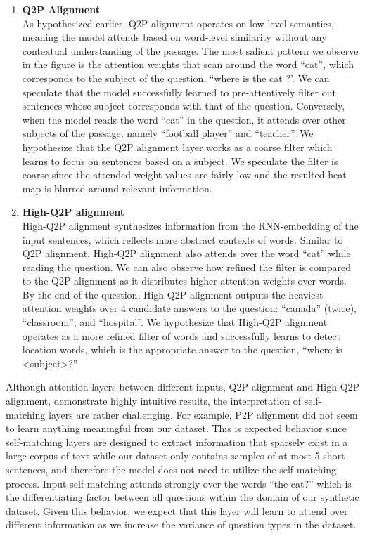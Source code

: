 \documentclass{article}
\begin{document}
\begin{enumerate}[label=(\alph*)]
	\item \textbf{Q2P Alignment} \\
	As hypothesized earlier, Q2P alignment operates on low-level semantics, meaning the model attends based on word-level similarity without any contextual understanding of the passage. The most salient pattern we observe in the figure is the attention weights that scan around the word ``cat'', which corresponds to the subject of the question, ``where is the cat ?'. We can speculate that the model successfully learned to pre-attentively filter out sentences whose subject corresponds with that of the question. Conversely, when the model reads the word ``cat'' in the question, it attends over other subjects of the passage, namely ``football player'' and ``teacher''. We hypothesize that the Q2P alignment layer works as a coarse filter which learns to focus on sentences based on a subject. We speculate the filter is coarse since the attended weight values are fairly low and the resulted heat map is blurred around relevant information. 
	
	\item \textbf{High-Q2P alignment} \\
	High-Q2P alignment synthesizes information from the RNN-embedding of the input sentences, which reflects more abstract contexts of words. Similar to Q2P alignment, High-Q2P alignment also attends over the word ``cat'' while reading the question. We can also observe how refined the filter is compared to the Q2P alignment as it distributes higher attention weights over words. By the end of the question, High-Q2P alignment outputs the heaviest attention weights over 4 candidate answers to the question: ``canada'' (twice), ``classroom'', and ``hospital''. We hypothesize that High-Q2P alignment operates as a more refined filter of words and successfully learns to detect location words, which is the appropriate answer to the question, ``where is \textless subject\textgreater ?''
\end{enumerate}

Although attention layers between different inputs, Q2P alignment and High-Q2P alignment, demonstrate highly intuitive results, the interpretation of self-matching layers are rather challenging. For example, P2P alignment did not seem to learn anything meaningful from our dataset. This is expected behavior since self-matching layers are designed to extract information that sparsely exist in a large corpus of text while our dataset only contains samples of at most 5 short sentences, and therefore the model does not need to utilize the self-matching process. Input self-matching attends strongly over the words ``the cat?'' which is the differentiating factor between all questions within the domain of our synthetic dataset. Given this behavior, we expect that this layer will learn to attend over different information as we increase the variance of question types in the dataset. 
\end{document}
